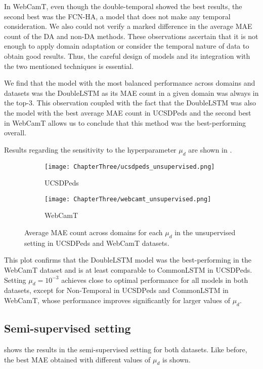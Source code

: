 In WebCamT, even though the double-temporal showed the best results, the second best was the FCN-HA, a model that does not make any temporal consideration. We also could not verify a marked difference in the average MAE count of the DA and non-DA methods. These observations ascertain that it is not enough to apply domain adaptation or consider the temporal nature of data to obtain good results. Thus, the careful design of models and its integration with the two mentioned techniques is essential.

We find that the model with the most balanced performance across domains and datasets was the DoubleLSTM as its MAE count in a given domain was always in the top-3. This observation coupled with the fact that the DoubleLSTM was also the model with the best average MAE count in UCSDPeds and the second best in WebCamT allows us to conclude that this method was the best-performing overall.

Results regarding the sensitivity to the hyperparameter $\mu_d$ are shown in .

\begin{figure}[!ht]
	\begin{subfigure}{.5\textwidth}
		\centering
		\texttt{[image: ChapterThree/ucsdpeds\_unsupervised.png]}
		\caption{UCSDPeds}
	\end{subfigure}
	\begin{subfigure}{.5\textwidth}
		\centering
		\texttt{[image: ChapterThree/webcamt\_unsupervised.png]}
		\caption{WebCamT}
	\end{subfigure}
	\caption{Average MAE count across domains for each $\mu_d$ in the unsupervised setting in UCSDPeds and WebCamT datasets.}
	\label{fig:lambda_d_unsup}
\end{figure}

This plot confirms that the DoubleLSTM model was the best-performing in the WebCamT dataset and is at least comparable to CommonLSTM in UCSDPeds. Setting $\mu_d = 10^{-3}$ achieves close to optimal performance for all models in both datasets, except for Non-Temporal in UCSDPeds and CommonLSTM in WebCamT, whose performance improves significantly for larger values of $\mu_d$.

\subsection{Semi-supervised setting}

 shows the results in the semi-supervised setting for both datasets. Like before, the best MAE obtained with different values of $\mu_d$ is shown.

